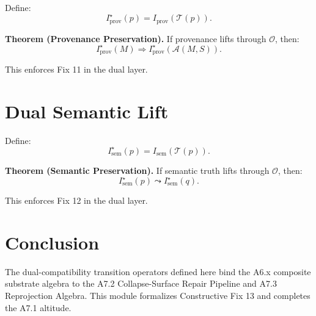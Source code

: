 \documentclass[11pt]{article}
\begin{document}
Define:
\[
I^\star_{\mathrm{prov}}(p) = I_{\mathrm{prov}}(\mathcal{T}(p)).
\]

\textbf{Theorem (Provenance Preservation).}
If provenance lifts through $\mathcal{O}$, then:
\[
I^\star_{\mathrm{prov}}(M) \Rightarrow
I^\star_{\mathrm{prov}}(\mathcal{A}(M,S)).
\]

This enforces Fix 11 in the dual layer.

\section{Dual Semantic Lift}

Define:
\[
I^\star_{\mathrm{sem}}(p) = I_{\mathrm{sem}}(\mathcal{T}(p)).
\]

\textbf{Theorem (Semantic Preservation).}
If semantic truth lifts through $\mathcal{O}$, then:
\[
I^\star_{\mathrm{sem}}(p) \leadsto I^\star_{\mathrm{sem}}(q).
\]

This enforces Fix 12 in the dual layer.

\section{Conclusion}

The dual-compatibility transition operators defined here bind the A6.x composite
substrate algebra to the A7.2 Collapse-Surface Repair Pipeline and A7.3
Reprojection Algebra. This module formalizes Constructive Fix 13 and completes
the A7.1 altitude.
\end{document}
